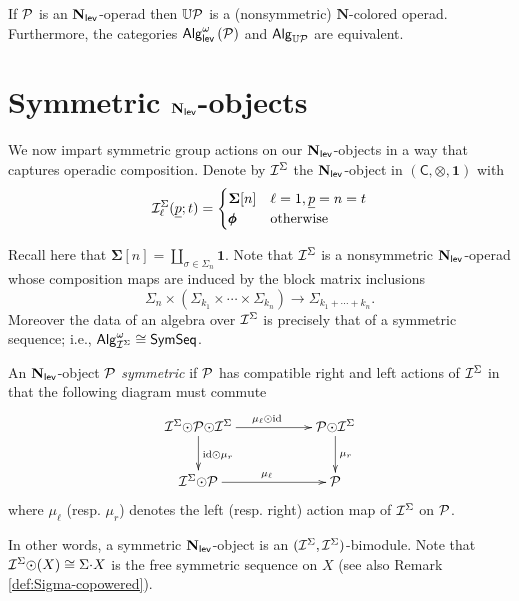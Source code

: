 \begin{proposition}
If $\mathcal{P}$ is an $\mathbf{N}_{\mathsf{lev}}$-operad then $\mathbb{U}\mathcal{P}$ is a (nonsymmetric) $\mathbf{N}$-colored operad. Furthermore, the categories $\mathsf{Alg}^{\omega}_{\mathsf{lev}}\left(\mathcal{P}\right)$ and $\mathsf{Alg}_{\mathbb{U}\mathcal{P}}$ are equivalent. 
\end{proposition}

\section{Symmetric $\mathbf{N}_{\mathsf{lev}}$-objects} We now impart symmetric group actions on our $\mathbf{N}_{\mathsf{lev}}$-objects in a way that captures operadic composition. Denote by $\mathcal{I}^{\Sigma}$ the $\mathbf{N}_{\mathsf{lev}}$-object in $(\mathsf{C},\otimes, \mathbf{1})$ with \[\mathcal{I}^{\Sigma}_{\ell}(\underline{p};t)=\begin{cases} 
    \mathbf{\Sigma}[n] & \ell=1, \underline{p}=n=t \\
    \pmb{\phi} & \text{otherwise} 
    \end{cases}\] 
    
Recall here that $\mathbf{\Sigma}[n]=\coprod_{\sigma\in\Sigma_n} \mathbf{1}$. Note that $\mathcal{I}^{\Sigma}$ is a nonsymmetric $\mathbf{N}_{\mathsf{lev}}$-operad whose composition maps are induced by the block matrix inclusions \[ \Sigma_n \times (\Sigma_{k_1}\times\cdots\times \Sigma_{k_n}) \to \Sigma_{k_1+\cdots+k_n}. \]  Moreover the data of an algebra over $\mathcal{I}^{\Sigma}$ is precisely that of a symmetric sequence; i.e.,  $\mathsf{Alg}^{\omega}_{\mathcal{I}^{\Sigma}}\cong \mathsf{SymSeq}$. 

\begin{definition}
An $\mathbf{N}_{\mathsf{lev}}$-object $\mathcal{P}$ \textit{symmetric} if $\mathcal{P}$ has compatible right and left actions of $\mathcal{I}^{\Sigma}$ in that the following diagram must commute \begin{equation*} 
    \xymatrix{
    \Isym\circdot \Cal{P} \circdot \Isym \ar[rr]^{\mu_{\ell}\circdot\id} \ar[d]^{\id\circdot \mu_{r}} && \Cal{P}\circdot \Isym \ar[d]^{\mu_r}
    \\
    \Isym\circdot \Cal{P} \ar[rr]^{\mu_{\ell}} && \Cal{P} }
\end{equation*}
where $\mu_{\ell}$ (resp. $\mu_r$) denotes the left (resp. right) action map of $\mathcal{I}^{\Sigma}$ on $\mathcal{P}$. 
\end{definition}

In other words, a symmetric $\mathbf{N}_{\mathsf{lev}}$-object is an $(\mathcal{I}^{\Sigma},\mathcal{I}^{\Sigma})$-bimodule. Note that $\mathcal{I}^{\Sigma} {\odot}(X)\cong \Sigma{\cdot} X$ is the free symmetric sequence on $X$ (see also Remark \ref{def:Sigma-copowered}).

